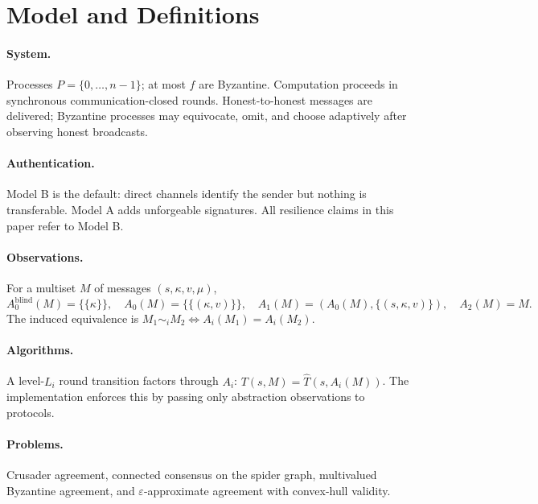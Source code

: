 \section{Model and Definitions}\label{sec:model}
\paragraph{System.} Processes $P=\{0,\ldots,n-1\}$; at most $f$ are Byzantine. Computation proceeds in synchronous communication-closed rounds. Honest-to-honest messages are delivered; Byzantine processes may equivocate, omit, and choose adaptively after observing honest broadcasts.
\paragraph{Authentication.} Model B is the default: direct channels identify the sender but nothing is transferable. Model A adds unforgeable signatures. All resilience claims in this paper refer to Model B.
\paragraph{Observations.} For a multiset $M$ of messages $(s,\kappa,v,\mu)$,
\[
A_0^{\mathrm{blind}}(M)=\{\!\{\kappa\}\!\},\quad
A_0(M)=\{\!\{(\kappa,v)\}\!\},\quad
A_1(M)=\left(A_0(M),\{(s,\kappa,v)\}\right),\quad
A_2(M)=M.
\]
The induced equivalence is $M_1\sim_i M_2\iff A_i(M_1)=A_i(M_2)$.
\paragraph{Algorithms.} A level-$L_i$ round transition factors through $A_i$: $T(s,M)=\widehat T(s,A_i(M))$. The implementation enforces this by passing only abstraction observations to protocols.
\paragraph{Problems.} Crusader agreement, connected consensus on the spider graph, multivalued Byzantine agreement, and $\varepsilon$-approximate agreement with convex-hull validity.
